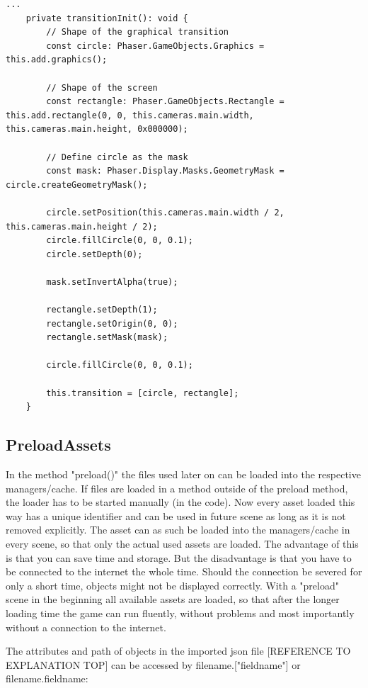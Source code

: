 \begin{lstlisting}[style=TypeScript, caption={BaseScene.ts}]
    ...
    private transitionInit(): void {
        // Shape of the graphical transition
        const circle: Phaser.GameObjects.Graphics = this.add.graphics();

        // Shape of the screen
        const rectangle: Phaser.GameObjects.Rectangle = this.add.rectangle(0, 0, this.cameras.main.width, this.cameras.main.height, 0x000000);

        // Define circle as the mask
        const mask: Phaser.Display.Masks.GeometryMask = circle.createGeometryMask();

        circle.setPosition(this.cameras.main.width / 2, this.cameras.main.height / 2);
        circle.fillCircle(0, 0, 0.1);
        circle.setDepth(0);

        mask.setInvertAlpha(true);

        rectangle.setDepth(1);
        rectangle.setOrigin(0, 0);
        rectangle.setMask(mask);

        circle.fillCircle(0, 0, 0.1);

        this.transition = [circle, rectangle];
    }
\end{lstlisting}

\subsection{PreloadAssets}\label{subsec:preloadassets}
In the method "preload()" the files used later on can be loaded into the respective managers/cache.
If files are loaded in a method outside of the preload method, the loader has to be started manually (in the code).
Now every asset loaded this way has a unique identifier and can be used in future scene
as long as it is not removed explicitly.
The asset can as such be loaded into the managers/cache in every scene,
so that only the actual used assets are loaded.
The advantage of this is that you can save time and storage.
But the disadvantage is that you have to be connected to the internet the whole time.
Should the connection be severed for only a short time, objects might not be displayed correctly.
With a "preload" scene in the beginning all available assets are loaded,
so that after the longer loading time the game can run fluently,
without problems and most importantly without a connection to the internet.

The attributes and path of objects in the imported json file [REFERENCE TO EXPLANATION TOP]
can be accessed by filename.["fieldname"] or filename.fieldname:

